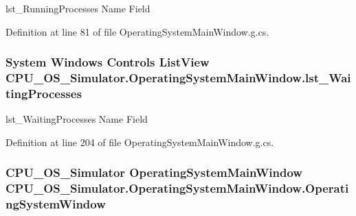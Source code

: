 lst\+\_\+\+Running\+Processes Name Field 



Definition at line 81 of file Operating\+System\+Main\+Window.\+g.\+cs.

\hypertarget{class_c_p_u___o_s___simulator_1_1_operating_system_main_window_a70185c0d33e102e203d76b79ac5c77db}{}
\subsubsection[{lst\+\_\+\+Waiting\+Processes}]{\setlength{\rightskip}{0pt plus 5cm}System Windows Controls List\+View C\+P\+U\+\_\+\+O\+S\+\_\+\+Simulator.\+Operating\+System\+Main\+Window.\+lst\+\_\+\+Waiting\+Processes}\label{class_c_p_u___o_s___simulator_1_1_operating_system_main_window_a70185c0d33e102e203d76b79ac5c77db}


lst\+\_\+\+Waiting\+Processes Name Field 



Definition at line 204 of file Operating\+System\+Main\+Window.\+g.\+cs.

\hypertarget{class_c_p_u___o_s___simulator_1_1_operating_system_main_window_ad42ee30cd6108b34ac88e9721db11b75}{}
\subsubsection[{Operating\+System\+Window}]{\setlength{\rightskip}{0pt plus 5cm}C\+P\+U\+\_\+\+O\+S\+\_\+\+Simulator {\bf Operating\+System\+Main\+Window} C\+P\+U\+\_\+\+O\+S\+\_\+\+Simulator.\+Operating\+System\+Main\+Window.\+Operating\+System\+Window\hspace{0.3cm}{\ttfamily [package]}}\label{class_c_p_u___o_s___simulator_1_1_operating_system_main_window_ad42ee30cd6108b34ac88e9721db11b75}


